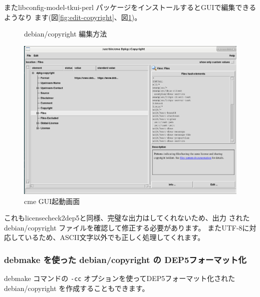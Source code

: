 \documentclass[mingoth,a4paper]{jsarticle}
\begin{document}
またlibconfig-model-tkui-perl パッケージをインストールするとGUIで編集できるようなり
ます(図\ref{fig:edit-copyright}、図\ref{fig:cme-gui})。

\begin{figure}[htbp]
 \begin{minipage}{0.5\hsize}
\begin{center}
\end{center}
\caption{debian/copyright 編集方法}
\label{fig:edit-copyright}
 \end{minipage}
 \begin{minipage}{0.5\hsize}
\begin{center}
\includegraphics[width=0.7\hsize]{image201609/cme-gui.png}
\end{center}
\caption{cme GUI起動画面}
\label{fig:cme-gui}
 \end{minipage}
\end{figure}

これもlicensecheck2dep5と同様、完璧な出力はしてくれないため、出力
された debian/copyright ファイルを確認して修正する必要があります。
またUTF-8に対応しているため、ASCII文字以外でも正しく処理してくれます。

\subsubsection{debmake を使った debian/copyright の DEP5フォーマット化}

debmake コマンドの \texttt{-cc} オプションを使ってDEP5フォーマット化された
debian/copyright を作成することもできます。
\end{document}
